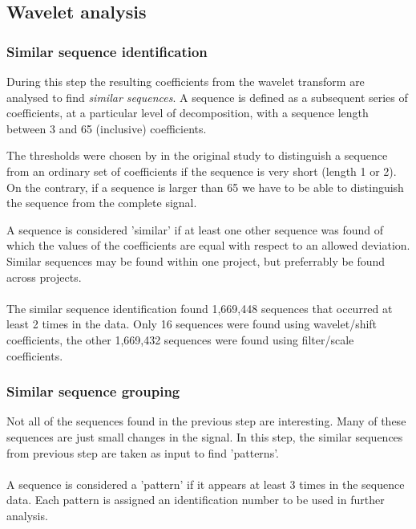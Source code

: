 \subsection{Wavelet analysis}
\subsubsection{Similar sequence identification}
During this step the resulting coefficients from the wavelet transform are
analysed to find \emph{similar sequences}\rm. A sequence is defined as a
subsequent series of coefficients, at a particular level of decomposition, with
a sequence length between 3 and 65 (inclusive) coefficients.

The thresholds were chosen by \citet{karus2013} in the original study to
distinguish a sequence from an ordinary set of coefficients if the sequence is
very short (length 1 or 2). On the contrary, if a sequence is larger than 65 we
have to be able to distinguish the sequence from the complete signal.

A sequence is considered 'similar' if at least one other sequence was found of
which the values of the coefficients are equal with respect to an allowed
deviation. Similar sequences may be found within one project, but preferrably be
found across projects.

\paragraph{}
The similar sequence identification found 1,669,448 sequences that occurred
at least 2 times in the data. Only 16 sequences were found using wavelet/shift
coefficients, the other 1,669,432 sequences were found using filter/scale
coefficients.

\subsubsection{Similar sequence grouping}
\label{def:pattern}
Not all of the sequences found in the previous step are interesting. Many of
these sequences are just small changes in the signal. In this step, the similar
sequences from previous step are taken as input to find 'patterns'.

\paragraph{}
A sequence is considered a 'pattern' if it appears at least 3 times in the
sequence data. Each pattern is assigned an identification number to be used in
further analysis.

